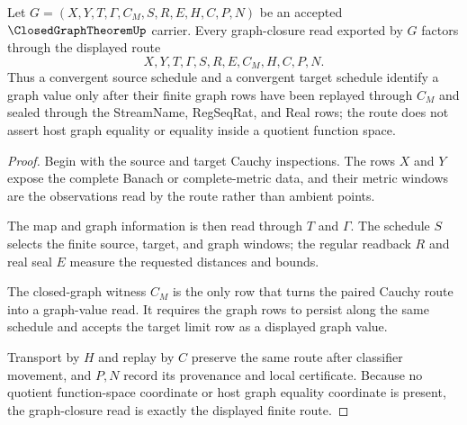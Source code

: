 \begin{theorem}
\label{thm:closed-graph-theorem-graph-closure-route}
Let $G=(X,Y,T,\Gamma,C_M,S,R,E,H,C,P,N)$ be an accepted $\ClosedGraphTheoremUp$ carrier. Every graph-closure read exported by $G$ factors through the displayed route
$$
X,Y,T,\Gamma,S,R,E,C_M,H,C,P,N .
$$
Thus a convergent source schedule and a convergent target schedule identify a graph value only after their finite graph rows have been replayed through $C_M$ and sealed through the StreamName, RegSeqRat, and Real rows; the route does not assert host graph equality or equality inside a quotient function space.
\end{theorem}
\begin{proof}
Begin with the source and target Cauchy inspections. The rows $X$ and $Y$ expose the complete Banach or complete-metric data, and their metric windows are the observations read by the route rather than ambient points.

The map and graph information is then read through $T$ and $\Gamma$. The schedule $S$ selects the finite source, target, and graph windows; the regular readback $R$ and real seal $E$ measure the requested distances and bounds.

The closed-graph witness $C_M$ is the only row that turns the paired Cauchy route into a graph-value read. It requires the graph rows to persist along the same schedule and accepts the target limit row as a displayed graph value.

Transport by $H$ and replay by $C$ preserve the same route after classifier movement, and $P,N$ record its provenance and local certificate. Because no quotient function-space coordinate or host graph equality coordinate is present, the graph-closure read is exactly the displayed finite route.
\end{proof}

